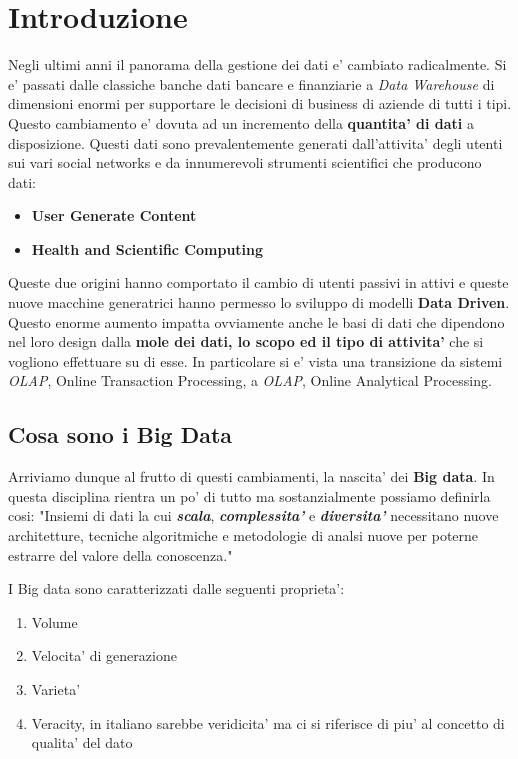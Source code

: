 
\chapter{Introduzione}
Negli ultimi anni il panorama della gestione dei dati e' cambiato radicalmente. Si e' passati dalle classiche banche dati bancare e finanziarie a \textit{Data Warehouse} di dimensioni enormi per supportare le decisioni di business di aziende di tutti i tipi.
Questo cambiamento e' dovuta ad un incremento della \textbf{quantita' di dati} a disposizione. Questi dati sono prevalentemente generati dall'attivita' degli utenti sui vari social networks e da innumerevoli strumenti scientifici che producono dati:

\begin{itemize}
  \item \textbf{User Generate Content} 
  \item \textbf{Health and Scientific Computing} 
\end{itemize}
Queste due origini hanno comportato il cambio di utenti passivi in attivi e queste nuove macchine generatrici hanno permesso lo sviluppo di modelli \textbf{Data Driven}. 
Questo enorme aumento impatta ovviamente anche le basi di dati che dipendono nel loro design dalla \textbf{mole dei dati, lo scopo ed il tipo di attivita'} che si vogliono effettuare su di esse. In particolare si e' vista una transizione da sistemi \textit{OLAP}, Online Transaction Processing, a \textit{OLAP}, Online Analytical Processing.


\section{Cosa sono i Big Data}
Arriviamo dunque al frutto di questi cambiamenti, la nascita' dei \textbf{Big data}. In questa disciplina rientra un po' di tutto ma sostanzialmente possiamo definirla cosi:
"Insiemi di dati la cui \textbf{\textit{scala}}, \textbf{\textit{complessita'}} e\textbf{\textit{ diversita'}} necessitano nuove architetture, tecniche algoritmiche e metodologie di analsi nuove per poterne estrarre del valore della conoscenza."

I Big data sono caratterizzati dalle seguenti proprieta':
\begin{enumerate}
  \item Volume
  \item Velocita' di generazione
  \item Varieta'
  \item Veracity, in italiano sarebbe veridicita' ma ci si riferisce di piu' al concetto di qualita' del dato
\end{enumerate}

